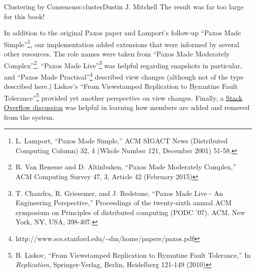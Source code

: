 \begin{aosachapter}{Clustering by Consensus}{s:cluster}{Dustin J. Mitchell}
The result was far too large for this book!

\label{references}

In addition to the original Paxos paper and Lamport's follow-up ``Paxos
Made Simple''\footnote{L. Lamport, ``Paxos Made Simple,'' ACM SIGACT
  News (Distributed Computing Column) 32, 4 (Whole Number 121, December
  2001) 51-58.}, our implementation added extensions that were informed
by several other resources. The role names were taken from ``Paxos Made
Moderately Complex''\footnote{R. Van Renesse and D. Altinbuken, ``Paxos
  Made Moderately Complex,'' ACM Computing Survey 47, 3, Article 42
  (February 2015)}. ``Paxos Made Live''\footnote{T. Chandra, R.
  Griesemer, and J. Redstone, ``Paxos Made Live - An Engineering
  Perspective,'' Proceedings of the twenty-sixth annual ACM symposium on
  Principles of distributed computing (PODC '07). ACM, New York, NY,
  USA, 398-407.} was helpful regarding snapshots in particular, and
``Paxos Made Practical''\footnote{http://www.scs.stanford.edu/\textasciitilde{}dm/home/papers/paxos.pdf}
described view changes (although not of the type described here.)
Liskov's ``From Viewstamped Replication to Byzantine Fault
Tolerance''\footnote{B. Liskov, ``From Viewstamped Replication to
  Byzantine Fault Tolerance,'' In \emph{Replication}, Springer-Verlag,
  Berlin, Heidelberg 121-149 (2010)} provided yet another perspective on
view changes. Finally, a
\href{http://stackoverflow.com/questions/21353312/in-part-time-parliament-why-does-using-the-membership-from-decree-n-3-work-to}{Stack
Overflow discussion} was helpful in learning how members are added and
removed from the system.

\end{aosachapter}
